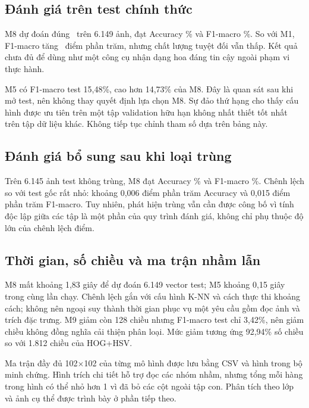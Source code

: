 \subsection{Đánh giá trên test chính thức}

M8 dự đoán đúng \CorrectCount\ trên 6.149 ảnh, đạt Accuracy \TestAccuracy\% và F1-macro \TestFOne\%. So với M1, F1-macro tăng \BaselineGain\ điểm phần trăm, nhưng chất lượng tuyệt đối vẫn thấp. Kết quả chưa đủ để dùng như một công cụ nhận dạng hoa đáng tin cậy ngoài phạm vi thực hành.

M5 có F1-macro test 15,48\%, cao hơn 14,73\% của M8. Đây là quan sát sau khi mở test, nên không thay quyết định lựa chọn M8. Sự đảo thứ hạng cho thấy cấu hình được ưu tiên trên một tập validation hữu hạn không nhất thiết tốt nhất trên tập dữ liệu khác. Không tiếp tục chỉnh tham số dựa trên bảng này.


\subsection{Đánh giá bổ sung sau khi loại trùng}

Trên 6.145 ảnh test không trùng, M8 đạt Accuracy \CleanAccuracy\% và F1-macro \CleanFOne\%. Chênh lệch so với test gốc rất nhỏ: khoảng 0,006 điểm phần trăm Accuracy và 0,015 điểm phần trăm F1-macro. Tuy nhiên, phát hiện trùng vẫn cần được công bố vì tính độc lập giữa các tập là một phần của quy trình đánh giá, không chỉ phụ thuộc độ lớn của chênh lệch điểm.

\subsection{Thời gian, số chiều và ma trận nhầm lẫn}

M8 mất khoảng 1,83 giây để dự đoán 6.149 vector test; M5 khoảng 0,15 giây trong cùng lần chạy. Chênh lệch gắn với cấu hình K-NN và cách thực thi khoảng cách; không nên ngoại suy thành thời gian phục vụ một yêu cầu gồm đọc ảnh và trích đặc trưng. M9 giảm còn 128 chiều nhưng F1-macro test chỉ 3,42\%, nên giảm chiều không đồng nghĩa cải thiện phân loại. Mức giảm tương ứng 92,94\% số chiều so với 1.812 chiều của HOG+HSV.

Ma trận đầy đủ 102\(\times\)102 của từng mô hình được lưu bằng CSV và hình trong bộ minh chứng. Hình trích chi tiết hỗ trợ đọc các nhóm nhầm, nhưng tổng mỗi hàng trong hình có thể nhỏ hơn 1 vì đã bỏ các cột ngoài tập con. Phân tích theo lớp và ảnh cụ thể được trình bày ở phần tiếp theo.
